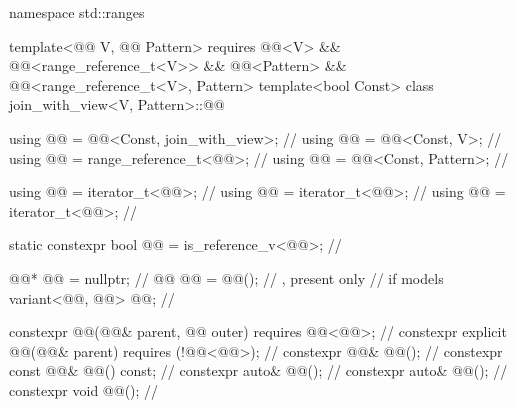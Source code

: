 \begin{codeblock}
namespace std::ranges {
  template<@@ V, @@ Pattern>
    requires @@<V> && @@<range_reference_t<V>>
          && @@<Pattern> && @@<range_reference_t<V>, Pattern>
  template<bool Const>
  class join_with_view<V, Pattern>::@@ {
    using @@ = @@<Const, join_with_view>;                  // \expos
    using @@ = @@<Const, V>;                                 // \expos
    using @@ = range_reference_t<@@>;                          // \expos
    using @@ = @@<Const, Pattern>;                    // \expos

    using @@ = iterator_t<@@>;                                 // \expos
    using @@ = iterator_t<@@>;                            // \expos
    using @@ = iterator_t<@@>;                        // \expos

    static constexpr bool @@ = is_reference_v<@@>;   // \expos

    @@* @@ = nullptr;                                          // \expos
    @@ @@ = @@();                          // \expos, present only
                                                                // if  models 
    variant<@@, @@> @@;                          // \expos

    constexpr @@(@@& parent, @@ outer)
      requires @@<@@>;                                     // \expos
    constexpr explicit @@(@@& parent)
      requires (!@@<@@>);                                  // \expos
    constexpr @@& @@();                                       // \expos
    constexpr const @@& @@() const;                           // \expos
    constexpr auto& @@();                                     // \expos
    constexpr auto& @@();                                        // \expos
    constexpr void @@();                                           // \expos

}}
\end{codeblock}
